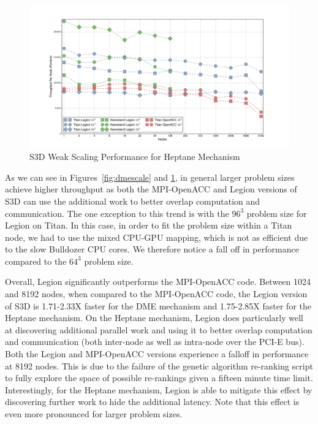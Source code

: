 \begin{figure}
\centering
\includegraphics[scale=0.4]{figs/hept_scaling.pdf}
\caption{S3D Weak Scaling Performance for Heptane Mechanism\label{fig:heptscale}}
\end{figure}

As we can see in Figures~\ref{fig:dmescale} and 
\ref{fig:heptscale}, in general larger 
problem sizes achieve higher throughput as both the MPI-OpenACC
and Legion versions of S3D can use the additional work to
better overlap computation and communication. The one 
exception to this trend is with the $96^3$ problem size
for Legion on Titan. In this case, in order to fit the 
problem size within a Titan node, we had to use the
mixed CPU-GPU mapping, which is not as efficient due to
the slow Bulldozer CPU cores. We therefore notice a fall
off in performance compared to the $64^3$ problem size.

Overall, Legion significantly outperforms the MPI-OpenACC
code. Between 1024 and 8192 nodes, when compared to the
MPI-OpenACC code, the Legion version of S3D is 1.71-2.33X 
faster for the DME mechanism and 1.75-2.85X faster for
the Heptane mechanism. On the Heptane mechanism, Legion
does particularly well at discovering additional parallel
work and using it to better overlap computation and
communication (both inter-node as well as intra-node over 
the PCI-E bus). Both the Legion and MPI-OpenACC versions
experience a falloff in performance at 8192 nodes. This
is due to the failure of the genetic algorithm re-ranking
script to fully explore the space of possible re-rankings
given a fifteen minute time limit. Interestingly, for the
Heptane mechanism, Legion is able to mitigate this effect
by discovering further work to hide the additional latency.
Note that this effect is even more pronounced for larger
problem sizes.

